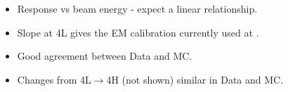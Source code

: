 \documentclass[10pt]{beamer}
\begin{document}
\begin{frame}
\begin{itemize}
\item Response vs beam energy - expect a linear relationship. 
\item Slope at 4L gives the EM calibration currently used at \atlas.
\item Good agreement between Data and MC.
\item Changes from 4L$\rightarrow$4H (not shown) similar in Data and MC.
\end{itemize}

\end{frame}
%
\end{document}
